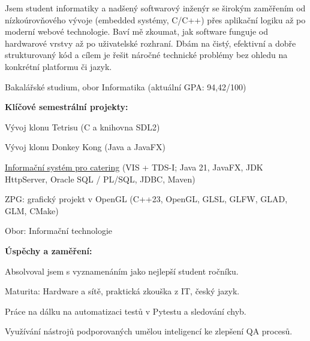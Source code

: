 \documentclass[10pt,a4paper]{article}
\begin{document}

Jsem student informatiky a nadšený softwarový inženýr se širokým zaměřením od nízkoúrovňového vývoje (embedded systémy, C/C++) přes aplikační logiku až po moderní webové technologie. Baví mě zkoumat, jak software funguje od hardwarové vrstvy až po uživatelské rozhraní. Dbám na čistý, efektivní a dobře strukturovaný kód a cílem je řešit náročné technické problémy bez ohledu na konkrétní platformu či jazyk.

\hspace*{7pt}Bakalářské studium, obor Informatika (aktuální GPA: 94,42/100)
\begin{cvedu}
  \item \textbf{Klíčové semestrální projekty:}
  \begin{cvsub}
    \item Vývoj klonu Tetrisu (C a knihovna SDL2)
    \item Vývoj klonu Donkey Kong (Java a JavaFX)
    \item \href{https://github.com/JaZafier00716/catering_project}{Informační systém pro catering} (VIS + TDS-I; Java 21, JavaFX, JDK HttpServer, Oracle SQL / PL/SQL, JDBC, Maven)
    \item ZPG: grafický projekt v OpenGL (C++23, OpenGL, GLSL, GLFW, GLAD, GLM, CMake)
  \end{cvsub}
\end{cvedu}

\hspace*{7pt}Obor: Informační technologie
\begin{cvedu}
  \item \textbf{Úspěchy a zaměření:}
  \begin{cvsub}
    \item Absolvoval jsem s vyznamenáním jako nejlepší student ročníku.
    \item Maturita: Hardware a sítě, praktická zkouška z IT, český jazyk.
  \end{cvsub}
\end{cvedu}

\begin{cvlist}
  \item Práce na dálku na automatizaci testů v Pytestu a sledování chyb.
  \item Využívání nástrojů podporovaných umělou inteligencí ke zlepšení QA procesů.
\end{cvlist}
\end{document}
